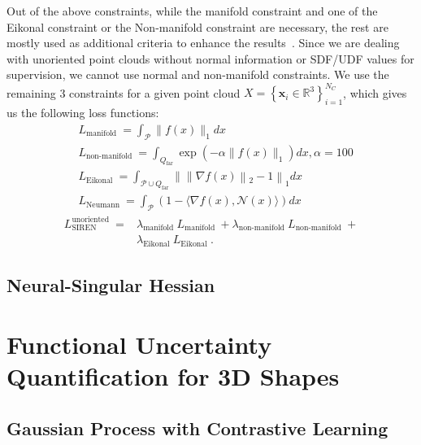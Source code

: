 Out of the above constraints, while the manifold constraint and one of the Eikonal constraint or the Non-manifold constraint are necessary, the rest are mostly used as additional criteria to enhance the results~\cite{DiGS}. Since we are dealing with unoriented point clouds without normal information or SDF/UDF values for supervision, we cannot use normal and non-manifold constraints. We use the remaining 3 constraints for a given point cloud $X=\left\{\mathbf{x}_{i} \in \mathbb{R}^{3}\right\}_{i=1}^{N_C}$, which gives us the following loss functions:
\begin{align*}
& L_{\text {manifold }}=\int_{\mathcal{P}}\|f(x)\|_{1} d x  \tag{2}\\
& L_{\text {non-manifold }}=\int_{Q_{\mathrm{far}}} \exp \left(-\alpha\|f(x)\|_{1}\right) d x, \alpha=100  \tag{3}\\
& L_{\text {Eikonal }}=\int_{\mathcal{P} \cup Q_{\mathrm{far}}}\| \| \nabla f(x)\left\|_{2}-1\right\|_{1} d x  \tag{4}\\
& L_{\text {Neumann }}=\int_{\mathcal{P}}(1-\langle\nabla f(x), \mathcal{N}(x)\rangle) d x \tag{5}
\end{align*}
\begin{align*}
L_{\text {SIREN }}^{\text {unoriented }}= & \lambda_{\text {manifold }} L_{\text {manifold }}+\lambda_{\text {non-manifold }} L_{\text {non-manifold }}+  \tag{7}\\
& \lambda_{\text {Eikonal }} L_{\text {Eikonal }} .
\end{align*}



    \subsection{Neural-Singular Hessian}



\section{Functional Uncertainty Quantification for 3D Shapes}



    \subsection{Gaussian Process with Contrastive Learning}



